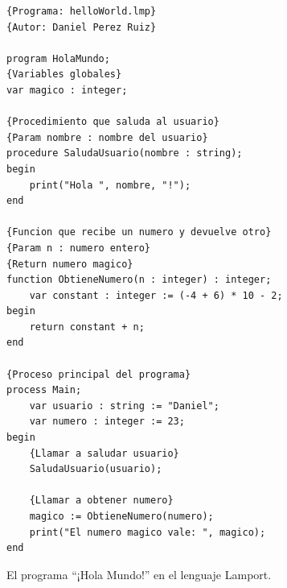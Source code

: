 \begin{figure}[h]
\begin{lstlisting}[style=lamportStyle]
{Programa: helloWorld.lmp}
{Autor: Daniel Perez Ruiz}

program HolaMundo;
{Variables globales}
var magico : integer;

{Procedimiento que saluda al usuario}
{Param nombre : nombre del usuario}
procedure SaludaUsuario(nombre : string);
begin
    print("Hola ", nombre, "!");
end

{Funcion que recibe un numero y devuelve otro}
{Param n : numero entero}
{Return numero magico}
function ObtieneNumero(n : integer) : integer;
    var constant : integer := (-4 + 6) * 10 - 2;
begin
    return constant + n;
end

{Proceso principal del programa}
process Main;
    var usuario : string := "Daniel";
    var numero : integer := 23;
begin
    {Llamar a saludar usuario}
    SaludaUsuario(usuario);
	
    {Llamar a obtener numero}
    magico := ObtieneNumero(numero);
    print("El numero magico vale: ", magico);
end
\end{lstlisting}
\caption{El programa ``¡Hola Mundo!'' en el lenguaje Lamport.}
\label{fig:lamportHolaMundo}
\end{figure}

